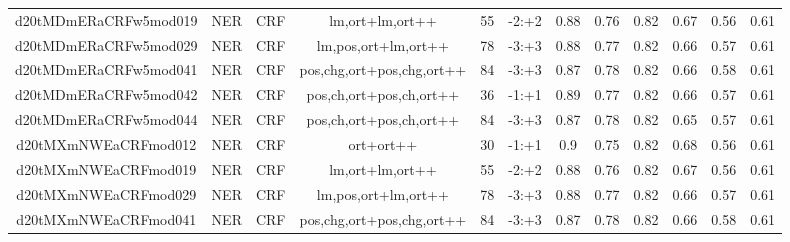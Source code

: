 \documentclass[a4paper]{article}
\begin{document}
\begin{landscape}
\begin{center}
\begin{tabular}{ |c|c|c|c|c|c|c|c|c|c|c|c|}
 	
 
 	
 		
 		\small{ d20tMDmERaCRFw5mod019 } & NER & CRF & lm,ort+lm,ort++  &  55 &  -2:+2  &  0.88 & 0.76 & 0.82  &  0.67 & 0.56 & 0.61 \\
 		

 	
 
 	
 		
 		\small{ d20tMDmERaCRFw5mod029 } & NER & CRF & lm,pos,ort+lm,ort++  &  78 &  -3:+3  &  0.88 & 0.77 & 0.82  &  0.66 & 0.57 & 0.61 \\
 		

 	
 
 	
 		
 		\small{ d20tMDmERaCRFw5mod041 } & NER & CRF & pos,chg,ort+pos,chg,ort++  &  84 &  -3:+3  &  0.87 & 0.78 & 0.82  &  0.66 & 0.58 & 0.61 \\
 		

 	
 
 	
 		
 		\small{ d20tMDmERaCRFw5mod042 } & NER & CRF & pos,ch,ort+pos,ch,ort++  &  36 &  -1:+1  &  0.89 & 0.77 & 0.82  &  0.66 & 0.57 & 0.61 \\
 		

 	
 
 	
 		
 		\small{ d20tMDmERaCRFw5mod044 } & NER & CRF & pos,ch,ort+pos,ch,ort++  &  84 &  -3:+3  &  0.87 & 0.78 & 0.82  &  0.65 & 0.57 & 0.61 \\
 		

 	
 
 	
 		
 		\small{ d20tMXmNWEaCRFmod012 } & NER & CRF & ort+ort++  &  30 &  -1:+1  &  0.9 & 0.75 & 0.82  &  0.68 & 0.56 & 0.61 \\
 		

 	
 
 	
 		
 		\small{ d20tMXmNWEaCRFmod019 } & NER & CRF & lm,ort+lm,ort++  &  55 &  -2:+2  &  0.88 & 0.76 & 0.82  &  0.67 & 0.56 & 0.61 \\
 		

 	
 
 	
 		
 		\small{ d20tMXmNWEaCRFmod029 } & NER & CRF & lm,pos,ort+lm,ort++  &  78 &  -3:+3  &  0.88 & 0.77 & 0.82  &  0.66 & 0.57 & 0.61 \\
 		

 	
 
 	
 		
 		\small{ d20tMXmNWEaCRFmod041 } & NER & CRF & pos,chg,ort+pos,chg,ort++  &  84 &  -3:+3  &  0.87 & 0.78 & 0.82  &  0.66 & 0.58 & 0.61 \\
 		


\end{tabular}
\end{center}
\end{landscape}
\end{document}
